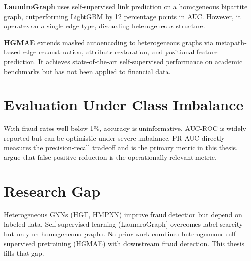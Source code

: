 \textbf{LaundroGraph} \citep{cardoso2022laundrograph} uses self-supervised link prediction on a homogeneous bipartite graph, outperforming LightGBM by 12 percentage points in AUC. However, it operates on a single edge type, discarding heterogeneous structure.

\textbf{HGMAE} \citep{tian2023hgmae} extends masked autoencoding to heterogeneous graphs via metapath-based edge reconstruction, attribute restoration, and positional feature prediction. It achieves state-of-the-art self-supervised performance on academic benchmarks but has not been applied to financial data.

\section{Evaluation Under Class Imbalance}
\label{sec:evaluation-metrics}

With fraud rates well below 1\%, accuracy is uninformative. AUC-ROC is widely reported but can be optimistic under severe imbalance. PR-AUC directly measures the precision-recall tradeoff and is the primary metric in this thesis. \citet{nasereddin2021alert} argue that false positive reduction is the operationally relevant metric.

\section{Research Gap}
\label{sec:research-gap}

Heterogeneous GNNs (HGT, HMPNN) improve fraud detection but depend on labeled data. Self-supervised learning (LaundroGraph) overcomes label scarcity but only on homogeneous graphs. No prior work combines heterogeneous self-supervised pretraining (HGMAE) with downstream fraud detection. This thesis fills that gap.
